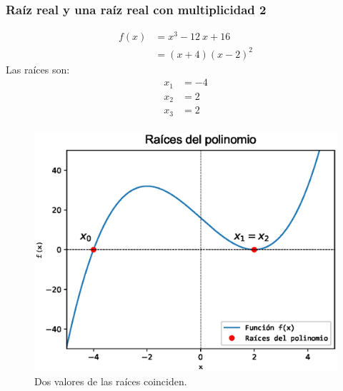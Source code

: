 \begin{frame}[fragile]
\captionsetup{justification=centering}
\frametitle{Raíz real y una raíz real con multiplicidad 2}
\begin{minipage}{5cm}
\fontsize{12}{12}\selectfont
\begin{align*}
f(x) &= x^{3} - 12 \: x + 16 \\
&= (x + 4)(x - 2)^{2}
\end{align*}
Las raíces son:
\begin{align*}
x_{1} &= -4 \\
x_{2} &= 2 \\
x_{3} &= 2 \\
\end{align*}
\end{minipage}
\hspace{0.5cm}
\begin{minipage}{4.5cm}
\begin{figure}
	\centering
	\includegraphics[scale=0.3]{Imagenes/raices_polinomio_2020_03.eps} 
	\caption{Dos valores de las raíces coinciden.}
\end{figure}
\end{minipage}
\end{frame}
